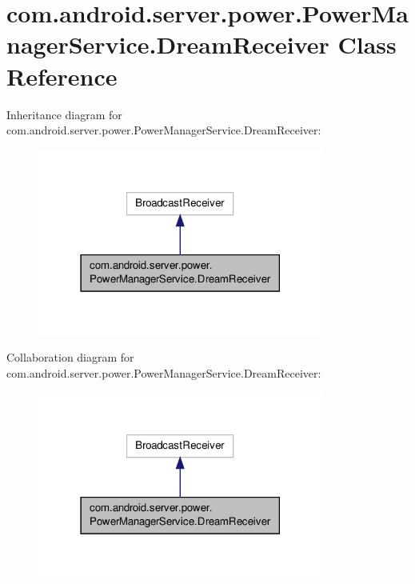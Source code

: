\hypertarget{classcom_1_1android_1_1server_1_1power_1_1PowerManagerService_1_1DreamReceiver}{\section{com.\-android.\-server.\-power.\-Power\-Manager\-Service.\-Dream\-Receiver Class Reference}
\label{classcom_1_1android_1_1server_1_1power_1_1PowerManagerService_1_1DreamReceiver}
}


Inheritance diagram for com.\-android.\-server.\-power.\-Power\-Manager\-Service.\-Dream\-Receiver\-:
\nopagebreak
\begin{figure}[H]
\begin{center}
\leavevmode
\includegraphics[width=266pt]{classcom_1_1android_1_1server_1_1power_1_1PowerManagerService_1_1DreamReceiver__inherit__graph}
\end{center}
\end{figure}


Collaboration diagram for com.\-android.\-server.\-power.\-Power\-Manager\-Service.\-Dream\-Receiver\-:
\nopagebreak
\begin{figure}[H]
\begin{center}
\leavevmode
\includegraphics[width=266pt]{classcom_1_1android_1_1server_1_1power_1_1PowerManagerService_1_1DreamReceiver__coll__graph}
\end{center}
\end{figure}

